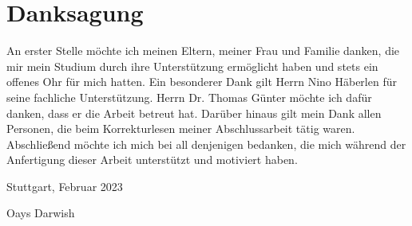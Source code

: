 \chapter*{Danksagung}
An erster Stelle möchte ich meinen Eltern, meiner Frau und Familie danken, die mir mein Studium durch ihre Unterstützung ermöglicht haben und stets ein offenes Ohr für mich hatten. Ein besonderer Dank gilt Herrn Nino Häberlen für seine fachliche Unterstützung. Herrn Dr. Thomas Günter möchte ich dafür danken, dass er die Arbeit betreut hat. Darüber hinaus gilt mein Dank allen Personen, die beim Korrekturlesen meiner Abschlussarbeit tätig waren. Abschließend möchte ich mich bei all denjenigen bedanken, die mich während der Anfertigung dieser Arbeit unterstützt und motiviert haben.


\vspace{1.3cm}
Stuttgart, Februar 2023

\vspace{1.6cm}
Oays Darwish